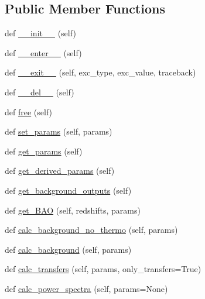 \subsection*{Public Member Functions}
\begin{DoxyCompactItemize}
\item 
def \mbox{\hyperlink{classcamb_1_1camb_1_1CAMBdata_a778dd557d8b5cbab767da49bfd4676f5}{\+\_\+\+\_\+init\+\_\+\+\_\+}} (self)
\item 
def \mbox{\hyperlink{classcamb_1_1camb_1_1CAMBdata_a825b359085f7d722b5466982a7f55e54}{\+\_\+\+\_\+enter\+\_\+\+\_\+}} (self)
\item 
def \mbox{\hyperlink{classcamb_1_1camb_1_1CAMBdata_a021893fba3cb6f0703a167961f9df2a4}{\+\_\+\+\_\+exit\+\_\+\+\_\+}} (self, exc\+\_\+type, exc\+\_\+value, traceback)
\item 
def \mbox{\hyperlink{classcamb_1_1camb_1_1CAMBdata_aa21844c242620c7c21fc0a5232aa8209}{\+\_\+\+\_\+del\+\_\+\+\_\+}} (self)
\item 
def \mbox{\hyperlink{classcamb_1_1camb_1_1CAMBdata_ab591e03bed9e6aae5d00f6258db48e33}{free}} (self)
\item 
def \mbox{\hyperlink{classcamb_1_1camb_1_1CAMBdata_a4cb0c3bb8e54d9ffce7774bd95972af5}{set\+\_\+params}} (self, params)
\item 
def \mbox{\hyperlink{classcamb_1_1camb_1_1CAMBdata_a47917b8227d3cacc5e0d28cac7810f95}{get\+\_\+params}} (self)
\item 
def \mbox{\hyperlink{classcamb_1_1camb_1_1CAMBdata_ac1f14ff98ff987cb382873be883e2552}{get\+\_\+derived\+\_\+params}} (self)
\item 
def \mbox{\hyperlink{classcamb_1_1camb_1_1CAMBdata_a16b60e35b6ec458d66db2895ada43acb}{get\+\_\+background\+\_\+outputs}} (self)
\item 
def \mbox{\hyperlink{classcamb_1_1camb_1_1CAMBdata_a4428c1c04012e8bfc4015656ed24412e}{get\+\_\+\+B\+AO}} (self, redshifts, params)
\item 
def \mbox{\hyperlink{classcamb_1_1camb_1_1CAMBdata_a5747c0c9bc806c82305597d3ed7b0099}{calc\+\_\+background\+\_\+no\+\_\+thermo}} (self, params)
\item 
def \mbox{\hyperlink{classcamb_1_1camb_1_1CAMBdata_a93e9fcebd9c7adb98d59d3ace6cd94c7}{calc\+\_\+background}} (self, params)
\item 
def \mbox{\hyperlink{classcamb_1_1camb_1_1CAMBdata_ad898126931124aa8b68591e04ca7f8cf}{calc\+\_\+transfers}} (self, params, only\+\_\+transfers=True)
\item 
def \mbox{\hyperlink{classcamb_1_1camb_1_1CAMBdata_a5bed120089296027889dc5fc40a91f10}{calc\+\_\+power\+\_\+spectra}} (self, params=None)

\end{DoxyCompactItemize}
